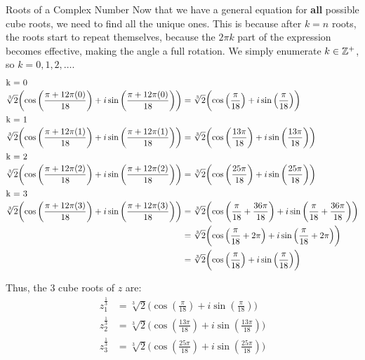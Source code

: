 \begin{example}{Roots of a Complex Number}
  Now that we have a general equation for \textbf{all} possible cube roots, we need to find all the unique ones.
  This is because after $k=n$ roots, the roots start to repeat themselves, because the $2 \pi k$ part of the expression becomes effective, making the angle a full rotation.
  We simply enumerate $k \in \operatorname{\mathbb{Z}^{+}}$, so $k = 0, 1, 2, \ldots$.
  \begin{align*}
    \shortintertext{k = 0}
    \sqrt[3]{2} \biggl( \cos \left( \frac{\pi + 12 \pi (0)}{18} \right) + i \sin \left( \frac{\pi + 12 \pi (0)}{18} \right) \biggr) &= \sqrt[3]{2} \biggl( \cos \left( \frac{\pi}{18} \right) + i \sin \left( \frac{\pi}{18} \right) \biggr) \\
    \shortintertext{k = 1}
    \sqrt[3]{2} \biggl( \cos \left( \frac{\pi + 12 \pi (1)}{18} \right) + i \sin \left( \frac{\pi + 12 \pi (1)}{18} \right) \biggr) &= \sqrt[3]{2} \biggl( \cos \left( \frac{13 \pi}{18} \right) + i \sin \left( \frac{13 \pi}{18} \right) \biggr) \\
    \shortintertext{k = 2}
    \sqrt[3]{2} \biggl( \cos \left( \frac{\pi + 12 \pi (2)}{18} \right) + i \sin \left( \frac{\pi + 12 \pi (2)}{18} \right) \biggr) &= \sqrt[3]{2} \biggl( \cos \left( \frac{25 \pi}{18} \right) + i \sin \left( \frac{25 \pi}{18} \right) \biggr) \\
    \shortintertext{k = 3}
    \sqrt[3]{2} \biggl( \cos \left( \frac{\pi + 12 \pi (3)}{18} \right) + i \sin \left( \frac{\pi + 12 \pi (3)}{18} \right) \biggr) &= \sqrt[3]{2} \biggl( \cos \left( \frac{\pi}{18} + \frac{36 \pi}{18} \right) + i \sin \left( \frac{\pi}{18} + \frac{36 \pi}{18} \right) \biggr) \\
                                                                                                                                    &= \sqrt[3]{2} \biggl( \cos \left( \frac{\pi}{18} + 2 \pi \right) + i \sin \left( \frac{\pi}{18} + 2 \pi \right) \biggr) \\
                                                                                                                                      &= \sqrt[3]{2} \biggl( \cos \left( \frac{\pi}{18} \right) + i \sin \left( \frac{\pi}{18} \right) \biggr)
  \end{align*}

  Thus, the 3 cube roots of $z$ are:
  \begin{align*}
    z_{1}^{\frac{1}{3}} &= \sqrt[3]{2} \biggl( \cos \left( \frac{\pi}{18} \right) + i \sin \left( \frac{\pi}{18} \right) \biggr) \\
    z_{2}^{\frac{1}{3}} &= \sqrt[3]{2} \biggl( \cos \left( \frac{13 \pi}{18} \right) + i \sin \left( \frac{13 \pi}{18} \right) \biggr) \\
    z_{3}^{\frac{1}{3}} &= \sqrt[3]{2} \biggl( \cos \left( \frac{25 \pi}{18} \right) + i \sin \left( \frac{25 \pi}{18} \right) \biggr)
  \end{align*}
\end{example}

